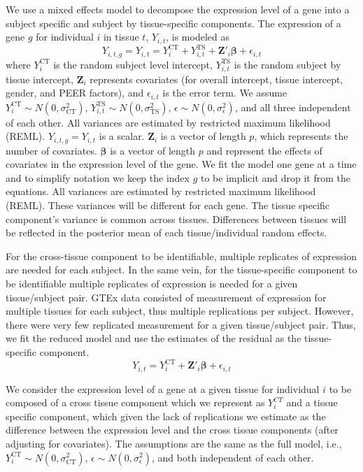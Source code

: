 \documentclass[10pt,letterpaper]{article}
\begin{document}
We use a mixed effects model to decompose the expression level of a gene into a subject specific and subject by tissue-specific components. The expression of a gene $g$ for individual $i$ in tissue $t$, $Y_{i,t}$, is modeled as
%
\[Y_{i,t,g} = Y_{i,t} =  Y_{i}^{\text{CT}}   + Y_{i,t}^{\text{TS}} + \mathbf{Z}'_i \boldsymbol{\beta} + \epsilon_{i,t}  \] 
%
where $Y_{i}^{\text{CT}}$ is the random subject level intercept,  $Y_{i,t}^{\text{TS}} $ is the random subject by tissue intercept, $\mathbf{Z}_i $ represents covariates (for overall intercept, tissue intercept, gender, and PEER factors), and $\epsilon_{i,t}$ is the error term. We assume $Y_{i}^{\text{CT}} \sim N(0,\sigma_{\text{CT}}^2)$, $Y_{i,t}^{\text{TS}} \sim N(0,\sigma_{\text{TS}}^2)$, $\epsilon \sim N(0,\sigma^2_{\epsilon})$, and all three independent of each other. All variances are estimated by restricted maximum likelihood (REML). $Y_{i,t,g}=Y_{i,t}$ is a scalar. $\mathbf{Z}_i$ is a vector of length $p$, which represents the number of covariates. $\boldsymbol{\beta}$ is a vector of length $p$ and represent the effects of covariates in the expression level of the gene. We fit the model one gene at a time and to simplify notation we keep the index $g$ to be implicit and drop it from the equations. All variances are estimated by restricted maximum likelihood (REML). These variances will be different for each gene. The tissue specific component's variance is common across tissues. Differences between tissues will be reflected in the posterior mean of each tissue/individual random effects.

For the cross-tissue component to be identifiable, multiple replicates of expression are needed for each subject. In the same vein, for the tissue-specific component to be identifiable multiple replicates of expression is needed for a given tissue/subject pair. GTEx\cite{Ardlie_2015} data consisted of measurement of expression for multiple tissues for each subject, thus multiple replications per subject. However, there were very few replicated measurement for a given tissue/subject pair. Thus, we fit the reduced model and use the estimates of the residual as the tissue-specific component.
%
\[Y_{i,t} =  Y_{i}^{\text{CT}}   + \mathbf{Z}'_i \boldsymbol{\beta} + \epsilon_{i,t}  \] 
%

We consider the expression level of a gene at a given tissue for individual $i$ to be composed of a cross tissue component which we represent as $Y_i^{CT}$ and a tissue specific component, which given the lack of replications we estimate as the difference between the expression level and the cross tissue components (after adjusting for covariates). The assumptions are the same as the full model, i.e., $Y_{i}^{\text{CT}} \sim N(0,\sigma_{\text{CT}}^2)$, $\epsilon \sim N(0,\sigma^2_{\epsilon})$, and both  independent of each other. 
\end{document}
